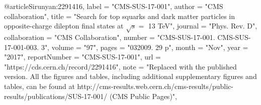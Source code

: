@article{Sirunyan:2291416,
      label          = "CMS-SUS-17-001",
      author        = "{CMS collaboration}",
      title         = "{Search for top squarks and dark matter particles in
                       opposite-charge dilepton final states at $\sqrt{s}=$ 13
                       TeV}",
      journal       = "Phys. Rev. D",
      collaboration = "CMS Collaboration",
      number        = "CMS-SUS-17-001. CMS-SUS-17-001-003. 3",
      volume        = "97",
      pages         = "032009. 29 p",
      month         = "Nov",
      year          = "2017",
      reportNumber  = "CMS-SUS-17-001",
      url           = "https://cds.cern.ch/record/2291416",
      note          = "Replaced with the published version. All the figures and
                       tables, including additional supplementary figures and
                       tables, can be found at
                       http://cms-results.web.cern.ch/cms-results/public-results/publications/SUS-17-001/
                       (CMS Public Pages)",
}


